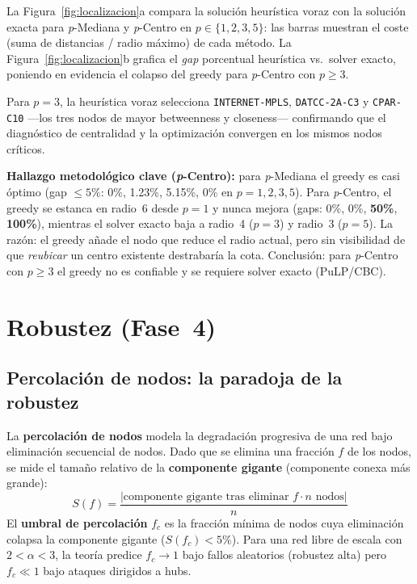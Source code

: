 \documentclass[12pt, a4paper]{article}
\newenvironment{aviso}{%
    \begin{mdframed}[backgroundcolor=naranjaFondo, linecolor=naranja,
        linewidth=1pt, innerleftmargin=8pt, innerrightmargin=8pt,
        innertopmargin=5pt, innerbottommargin=5pt,
        skipabove=6pt, skipbelow=6pt]
    \small
}{\end{mdframed}}
\begin{document}
La Figura~\ref{fig:localizacion}a compara la solución heurística voraz con
la solución exacta para \textit{p}-Mediana y \textit{p}-Centro en $p \in
\{1,2,3,5\}$: las barras muestran el coste (suma de distancias / radio
máximo) de cada método. La Figura~\ref{fig:localizacion}b grafica el
\textit{gap} porcentual heurística vs.\ solver exacto, poniendo en evidencia
el colapso del greedy para \textit{p}-Centro con $p \geq 3$.

Para $p=3$, la heurística voraz selecciona \texttt{INTERNET-MPLS},
\texttt{DATCC-2A-C3} y \texttt{CPAR-C10} ---los tres nodos de mayor
betweenness y closeness--- confirmando que el diagnóstico de centralidad
y la optimización convergen en los mismos nodos críticos.

\begin{aviso}
\textbf{Hallazgo metodológico clave (\textit{p}-Centro):} para
\textit{p}-Mediana el greedy es casi óptimo (gap $\leq 5\%$: 0\%, 1.23\%,
5.15\%, 0\% en $p=1,2,3,5$). Para \textit{p}-Centro, el greedy se estanca
en radio~6 desde $p=1$ y nunca mejora (gaps: 0\%, 0\%, \textbf{50\%},
\textbf{100\%}), mientras el solver exacto baja a radio~4 ($p=3$) y radio~3
($p=5$). La razón: el greedy añade el nodo que reduce el radio actual, pero
sin visibilidad de que \textit{reubicar} un centro existente destrabaría la
cota. Conclusión: para \textit{p}-Centro con $p\geq 3$ el greedy no es
confiable y se requiere solver exacto (PuLP/CBC).
\end{aviso}

\section{Robustez (Fase~4)}

\subsection{Percolación de nodos: la paradoja de la robustez}

La \textbf{percolación de nodos} modela la degradación progresiva de una red
bajo eliminación secuencial de nodos. Dado que se elimina una fracción $f$
de los nodos, se mide el tamaño relativo de la \textbf{componente gigante}
(componente conexa más grande):
\[
  S(f) = \frac{|\text{componente gigante tras eliminar } f \cdot n \text{ nodos}|}{n}
\]
El \textbf{umbral de percolación} $f_c$ es la fracción mínima de nodos cuya
eliminación colapsa la componente gigante ($S(f_c) < 5\%$). Para una red
libre de escala con $2 < \alpha < 3$, la teoría predice $f_c \to 1$ bajo
fallos aleatorios (robustez alta) pero $f_c \ll 1$ bajo ataques dirigidos a hubs.
\end{document}
